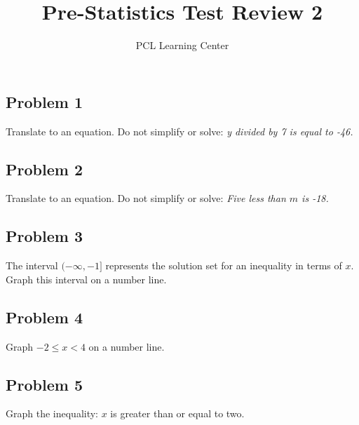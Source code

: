 \documentclass[12pt]{article}
\title{Pre-Statistics Test Review 2}
\author{PCL Learning Center}
\date{}
\begin{document}
\maketitle

\subsection*{Problem 1}
Translate to an equation. Do not simplify or solve:  
\textit{y divided by 7 is equal to -46.}

\subsection*{Problem 2}
Translate to an equation. Do not simplify or solve:  
\textit{Five less than $m$ is -18.}

\subsection*{Problem 3}
The interval $(-\infty, -1]$ represents the solution set for an inequality in terms of $x$.  
Graph this interval on a number line.  

\begin{center}
\end{center}

\subsection*{Problem 4}
Graph $-2 \leq x < 4$ on a number line.  

\begin{center}
\end{center}

\subsection*{Problem 5}
Graph the inequality: $x$ is greater than or equal to two.  
\end{document}
